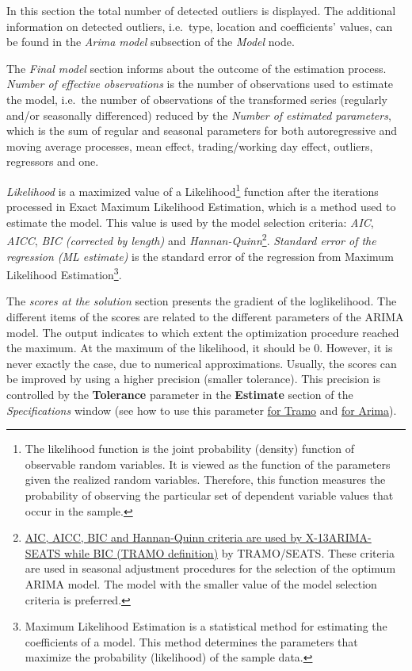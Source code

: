 \documentclass[
  letterpaper,
  DIV=11,
  numbers=noendperiod]{scrreprt}
\begin{document}
In this section the total number of detected outliers is displayed. The
additional information on detected outliers, i.e.~type, location and
coefficients' values, can be found in the \emph{Arima model} subsection
of the \emph{Model} node.

The \emph{Final model} section informs about the outcome of the
estimation process. \emph{Number of effective observations} is the
number of observations used to estimate the model, i.e.~the number of
observations of the transformed series (regularly and/or seasonally
differenced) reduced by the \emph{Number of estimated parameters}, which
is the sum of regular and seasonal parameters for both autoregressive
and moving average processes, mean effect, trading/working day effect,
outliers, regressors and one.

\emph{Likelihood} is a maximized value of a Likelihood\footnote{The
  likelihood function is the joint probability (density) function of
  observable random variables. It is viewed as the function of the
  parameters given the realized random variables. Therefore, this
  function measures the probability of observing the particular set of
  dependent variable values that occur in the sample.} function after
the iterations processed in Exact Maximum Likelihood Estimation, which
is a method used to estimate the model. This value is used by the model
selection criteria: \emph{AIC}, \emph{AICC}, \emph{BIC (corrected by
length)} and \emph{Hannan-Quinn}\footnote{\protect\hyperlink{model-selection-criteria}{AIC,
  AICC, BIC and Hannan-Quinn criteria are used by X-13ARIMA-SEATS while
  BIC (TRAMO definition)} by TRAMO/SEATS. These criteria are used in
  seasonal adjustment procedures for the selection of the optimum ARIMA
  model. The model with the smaller value of the model selection
  criteria is preferred.}. \emph{Standard error of the regression (ML
estimate)} is the standard error of the regression from Maximum
Likelihood Estimation\footnote{Maximum Likelihood Estimation is a
  statistical method for estimating the coefficients of a model. This
  method determines the parameters that maximize the probability
  (likelihood) of the sample data.}.

The \emph{scores at the solution} section presents the gradient of the
loglikelihood. The different items of the scores are related to the
different parameters of the ARIMA model. The output indicates to which
extent the optimization procedure reached the maximum. At the maximum of
the likelihood, it should be 0. However, it is never exactly the case,
due to numerical approximations. Usually, the scores can be improved by
using a higher precision (smaller tolerance). This precision is
controlled by the \textbf{Tolerance} parameter in the \textbf{Estimate}
section of the \emph{Specifications} window (see how to use this
parameter \protect\hyperlink{estimate}{for Tramo} and
\protect\hyperlink{estimate}{for Arima}).
\end{document}
